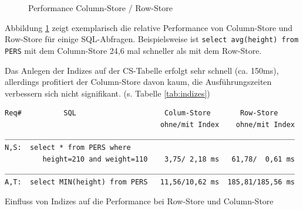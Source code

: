\begin{figure}[h]
\centering
{}
\caption[Performance Column-Store / Row-Store]{Performance Column-Store / Row-Store\footnotemark}
\label{bench}
\end{figure}

Abbildung \ref{bench} zeigt exemplarisch die relative Performance von Column-Store und Row-Store für einige SQL-Abfragen.
Beispielsweise ist \texttt{select avg(height) from PERS} mit dem Column-Store 24,6 mal schneller als mit dem Row-Store.

Das Anlegen der Indizes auf der CS-Tabelle erfolgt sehr schnell (ca. 150ms), 
allerdings profitiert der Column-Store davon kaum, die Ausführungszeiten verbessern
sich nicht signifikant. (s. Tabelle \ref{tab:indizes})

\begin{table}[!ht]
  \centering
\begin{verbatim}
Req#          SQL                     Colum-Store       Row-Store
                                     ohne/mit Index    ohne/mit Index
_____________________________________________________________________
N,S:  select * from PERS where 
         height=210 and weight=110    3,75/ 2,18 ms   61,78/  0,61 ms
_____________________________________________________________________
A,T:  select MIN(height) from PERS   11,56/10,62 ms  185,81/185,56 ms
\end{verbatim}
  \caption{Einfluss von Indizes auf die Performance bei Row-Store und Column-Store}
  \label{tab:indizes}
\end{table}

